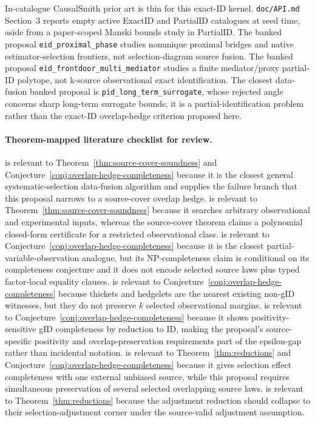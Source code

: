 \documentclass[11pt]{article}
\theoremstyle{definition}
\theoremstyle{plain}
\theoremstyle{remark}
\begin{document}
In-catalogue CausalSmith prior art is thin for this exact-ID kernel.
\texttt{doc/API.md} Section~3 reports empty active ExactID and PartialID
catalogues at seed time, aside from a paper-scoped Manski bounds study in
PartialID.  The banked proposal \texttt{eid\_proximal\_phase} studies
nonunique proximal bridges and native estimator-selection frontiers, not
selection-diagram source fusion.  The banked proposal
\texttt{eid\_frontdoor\_multi\_mediator} studies a finite mediator/proxy
partial-ID polytope, not k-source observational exact identification.
The closest data-fusion banked proposal is \texttt{pid\_long\_term\_surrogate},
whose rejected angle concerns sharp long-term surrogate bounds; it is a
partial-identification problem rather than the exact-ID overlap-hedge
criterion proposed here.

\paragraph{Theorem-mapped literature checklist for review.}
\citet{LeeGhassamiShpitser2024DataFusionSelection} is relevant to
Theorem~\ref{thm:source-cover-soundness} and
Conjecture~\ref{conj:overlap-hedge-completeness} because it is the closest
general systematic-selection data-fusion algorithm and supplies the failure
branch that this proposal narrows to a source-cover overlap hedge.
\citet{TikkaHyttinenKarvanen2021DoSearch} is relevant to
Theorem~\ref{thm:source-cover-soundness} because it searches arbitrary
observational and experimental inputs, whereas the source-cover theorem claims
a polynomial closed-form certificate for a restricted observational class.
\citet{LeeBareinboim2020PartialObservability} is relevant to
Conjecture~\ref{conj:overlap-hedge-completeness} because it is the closest
partial-variable-observation analogue, but its NP-completeness claim is
conditional on its completeness conjecture and it does not encode selected
source laws plus typed factor-local equality clauses.  \citet{LeeCorreaBareinboim2020GID}
is relevant to Conjecture~\ref{conj:overlap-hedge-completeness} because
thickets and hedgelets are the nearest existing non-gID witnesses, but they do
not preserve \(k\) selected observational margins.  \citet{KivvaMokhtarianEtesamiKiyavash2022RevisitGID}
is relevant to Conjecture~\ref{conj:overlap-hedge-completeness} because it
shows positivity-sensitive gID completeness by reduction to ID, making the
proposal's source-specific positivity and overlap-preservation requirements
part of the epsilon-gap rather than incidental notation.  \citet{CorreaTianBareinboim2019SelectionEffects}
is relevant to Theorem~\ref{thm:reductions} and
Conjecture~\ref{conj:overlap-hedge-completeness} because it gives selection
effect completeness with one external unbiased source, while this proposal
requires simultaneous preservation of several selected overlapping source
laws.  \citet{CorreaTianBareinboim2018Adjustment} is relevant to
Theorem~\ref{thm:reductions} because the adjustment reduction should collapse
to their selection-adjustment corner under the source-valid adjustment
assumption.
\end{document}
